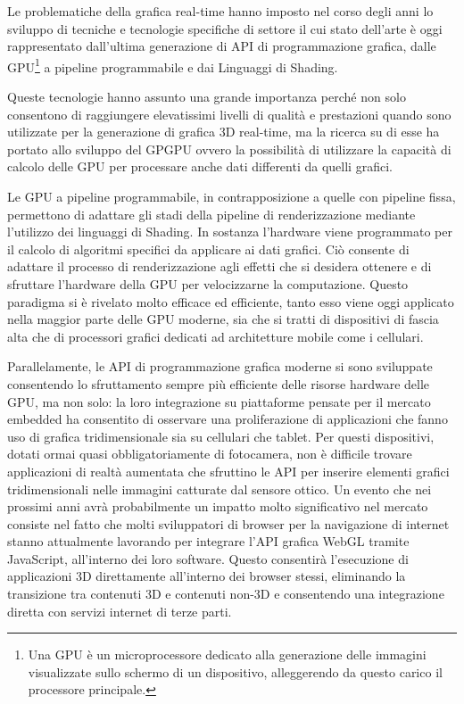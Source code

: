 Le problematiche della grafica real-time hanno imposto nel corso degli anni lo sviluppo di tecniche e tecnologie specifiche di settore il cui stato dell'arte \`e oggi rappresentato dall'ultima generazione di \ac{API} di programmazione grafica, dalle \ac{GPU}\footnote{Una \ac{GPU} \`e un microprocessore dedicato alla generazione delle immagini visualizzate sullo schermo di un dispositivo, alleggerendo da questo carico il processore principale.} a pipeline programmabile e dai Linguaggi di Shading.

Queste tecnologie hanno assunto una grande importanza perch\'e non solo consentono di raggiungere elevatissimi livelli di qualit\`a e prestazioni quando sono utilizzate per la generazione di grafica 3D real-time, ma la ricerca su di esse ha portato allo sviluppo del \ac{GPGPU} ovvero la possibilit\`a di utilizzare la capacit\`a di calcolo delle \ac{GPU} per processare anche dati differenti da quelli grafici.

Le \ac{GPU} a pipeline programmabile, in contrapposizione a quelle con pipeline fissa, permettono di adattare gli stadi della pipeline di renderizzazione mediante l'utilizzo dei linguaggi di Shading. In sostanza l'hardware viene programmato per il calcolo di algoritmi specifici da applicare ai dati grafici. Ci\`o consente di adattare il processo di renderizzazione agli effetti che si desidera ottenere e di sfruttare l'hardware della \ac{GPU} per velocizzarne la computazione. Questo paradigma si \`e rivelato molto efficace ed efficiente, tanto esso viene oggi applicato nella maggior parte delle \ac{GPU} moderne, sia che si tratti di dispositivi di fascia alta che di processori grafici dedicati ad architetture mobile come i cellulari.

Parallelamente, le \ac{API} di programmazione grafica moderne si sono sviluppate consentendo lo sfruttamento sempre pi\`u efficiente delle risorse hardware delle \ac{GPU}, ma non solo: la loro integrazione su piattaforme pensate per il mercato embedded ha consentito di osservare una proliferazione di applicazioni che fanno uso di grafica tridimensionale sia su cellulari che tablet. Per questi dispositivi, dotati ormai quasi obbligatoriamente di fotocamera, non \`e difficile trovare applicazioni di realt\`a aumentata che sfruttino le \ac{API} per inserire elementi grafici tridimensionali nelle immagini catturate dal sensore ottico. Un evento che nei prossimi anni avr\`a probabilmente un impatto molto significativo nel mercato consiste nel fatto che molti sviluppatori di browser per la navigazione di internet stanno attualmente lavorando per integrare l'\ac{API} grafica WebGL tramite JavaScript, all'interno dei loro software. Questo consentir\`a l'esecuzione di applicazioni 3D direttamente all'interno dei browser stessi, eliminando la transizione tra contenuti 3D e contenuti non-3D e consentendo una integrazione diretta con servizi internet di terze parti.


